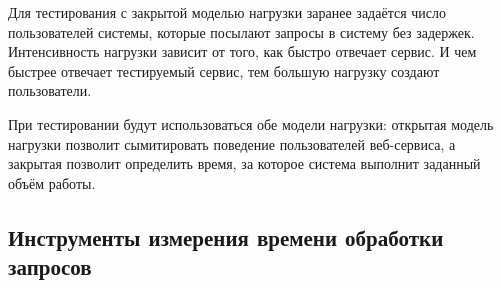 
Для тестирования с закрытой моделью нагрузки заранее задаётся число пользователей системы, которые посылают запросы в систему без задержек. Интенсивность нагрузки зависит от того, как быстро отвечает сервис. И чем быстрее отвечает тестируемый сервис, тем большую нагрузку создают пользователи. 




При тестировании будут использоваться обе модели нагрузки: открытая модель нагрузки позволит сымитировать поведение пользователей веб-сервиса, а закрытая позволит определить время, за которое система выполнит заданный объём работы.



\subsection{Инструменты измерения времени обработки запросов}

